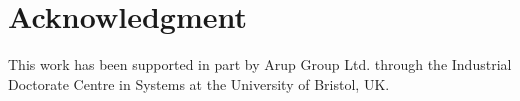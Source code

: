 \documentclass[journal]{IEEEtran}
\begin{document}



\section*{Acknowledgment}

This work has been supported in part by Arup Group Ltd. through the
Industrial Doctorate Centre in Systems at the University of Bristol,
UK.


\ifCLASSOPTIONcaptionsoff
  \newpage
\fi







%

\end{document}
